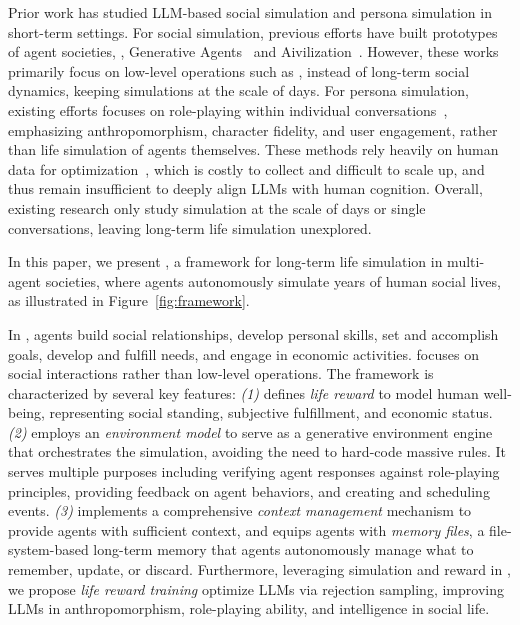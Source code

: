 Prior work has studied LLM-based social simulation and persona simulation in short-term settings.
For social simulation,
previous efforts have built prototypes of agent societies,
\eg, Generative Agents~\citep{park2023generative} and Aivilization~\citep{fan2026aivilization}.
However, these works primarily focus on low-level operations
such as ,
instead of long-term social dynamics, keeping simulations at the scale of days.
For persona simulation,
existing efforts focuses on role-playing within individual conversations~\citep{chen2024from, shao2023character},
emphasizing anthropomorphism, character fidelity, and user engagement, 
rather than life simulation of agents themselves.
These methods rely heavily on human data for optimization~\citep{wang2025coser, liu-etal-2025-cogdual, du2026her}, which is costly to collect and difficult to scale up, and thus remain insufficient to deeply align LLMs with human cognition.
Overall, existing research only study simulation at the scale of days or single conversations,
leaving long-term life simulation unexplored.


In this paper, we present \method,
a framework for long-term life simulation in multi-agent societies,
where agents autonomously simulate years of human social lives, as illustrated in Figure~\ref{fig:framework}.

In \method, agents build social relationships,
develop personal skills,
set and accomplish goals,
develop and fulfill needs,
and engage in economic activities.
\method focuses on social interactions rather than low-level operations.
The framework is characterized by several key features:
\textit{(1)} \method defines \textit{life reward} to model human well-being,
representing social standing, subjective fulfillment, and economic status.
\textit{(2)} \method employs an \textit{environment model} to serve as a generative environment engine that orchestrates the simulation,
avoiding the need to hard-code massive rules.
It serves multiple purposes including
verifying agent responses against role-playing principles,
providing feedback on agent behaviors, and creating and scheduling events.
\textit{(3)} \method implements a comprehensive \textit{context management} mechanism to provide agents with sufficient context, and equips agents with \textit{memory files}, a file-system-based long-term memory that agents autonomously manage what to remember, update, or discard.
Furthermore, leveraging simulation and reward in \method, we propose \textit{life reward training} optimize LLMs via rejection sampling,
improving LLMs in anthropomorphism, role-playing ability, and intelligence in social life.

